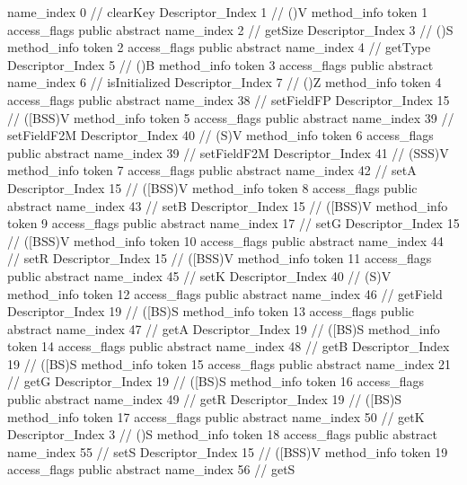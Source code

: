 {{{{{					name_index	0		// clearKey
					Descriptor_Index	1		// ()V
				}
				method_info {
					token	1
					access_flags	public abstract
					name_index	2		// getSize
					Descriptor_Index	3		// ()S
				}
				method_info {
					token	2
					access_flags	public abstract
					name_index	4		// getType
					Descriptor_Index	5		// ()B
				}
				method_info {
					token	3
					access_flags	public abstract
					name_index	6		// isInitialized
					Descriptor_Index	7		// ()Z
				}
				method_info {
					token	4
					access_flags	public abstract
					name_index	38		// setFieldFP
					Descriptor_Index	15		// ([BSS)V
				}
				method_info {
					token	5
					access_flags	public abstract
					name_index	39		// setFieldF2M
					Descriptor_Index	40		// (S)V
				}
				method_info {
					token	6
					access_flags	public abstract
					name_index	39		// setFieldF2M
					Descriptor_Index	41		// (SSS)V
				}
				method_info {
					token	7
					access_flags	public abstract
					name_index	42		// setA
					Descriptor_Index	15		// ([BSS)V
				}
				method_info {
					token	8
					access_flags	public abstract
					name_index	43		// setB
					Descriptor_Index	15		// ([BSS)V
				}
				method_info {
					token	9
					access_flags	public abstract
					name_index	17		// setG
					Descriptor_Index	15		// ([BSS)V
				}
				method_info {
					token	10
					access_flags	public abstract
					name_index	44		// setR
					Descriptor_Index	15		// ([BSS)V
				}
				method_info {
					token	11
					access_flags	public abstract
					name_index	45		// setK
					Descriptor_Index	40		// (S)V
				}
				method_info {
					token	12
					access_flags	public abstract
					name_index	46		// getField
					Descriptor_Index	19		// ([BS)S
				}
				method_info {
					token	13
					access_flags	public abstract
					name_index	47		// getA
					Descriptor_Index	19		// ([BS)S
				}
				method_info {
					token	14
					access_flags	public abstract
					name_index	48		// getB
					Descriptor_Index	19		// ([BS)S
				}
				method_info {
					token	15
					access_flags	public abstract
					name_index	21		// getG
					Descriptor_Index	19		// ([BS)S
				}
				method_info {
					token	16
					access_flags	public abstract
					name_index	49		// getR
					Descriptor_Index	19		// ([BS)S
				}
				method_info {
					token	17
					access_flags	public abstract
					name_index	50		// getK
					Descriptor_Index	3		// ()S
				}
				method_info {
					token	18
					access_flags	public abstract
					name_index	55		// setS
					Descriptor_Index	15		// ([BSS)V
				}
				method_info {
					token	19
					access_flags	public abstract
					name_index	56		// getS
}}}}}
